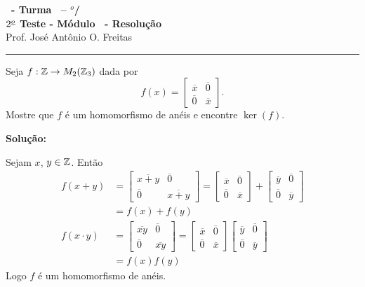\documentclass[12pt]{exam}
\begin{document}
\begin{center}
{\Large\bf \disciplina\ - Turma \turma\ -- \semestre$^{o}$/\ano} \\ \vspace{9pt} {\large\bf
$2^{\underline{o}}$ Teste - M\'odulo \modulo\ - Resolu\c{c}\~ao}\\
\vspace{9pt} Prof. Jos{\'e} Ant{\^o}nio O. Freitas
\end{center}
\hrule

\vspace{.6cm}

\questao{} Seja $f : \mathbb{Z} \to M_2(\mathbb{Z}_3)$ dada por
\[
	f(x) = \begin{bmatrix}
		\overline{x} & \overline{0}\\
		\overline{0} & \overline{x}
	\end{bmatrix}.
\]
Mostre que $f$ \'e um homomorfismo de an\'eis e encontre $\ker(f)$.

\noindent\textbf{Solu\c{c}\~ao:}

Sejam $x$, $y \in \mathbb{Z}$. Ent\~ao
\begin{align*}
	f(x + y) &= \begin{bmatrix}
		\overline{x + y} & \overline{0}\\
		\overline{0} & \overline{x + y}
	\end{bmatrix} = \begin{bmatrix}
		\overline{x} & \overline{0}\\
		\overline{0} & \overline{x}
	\end{bmatrix} + \begin{bmatrix}
		\overline{y} & \overline{0}\\
		\overline{0} & \overline{y}
	\end{bmatrix}\\ &= f(x) + f(y)\\
	f(x\cdot y) &= \begin{bmatrix}
		\overline{xy} & \overline{0}\\
		\overline{0} & \overline{xy}
	\end{bmatrix} = \begin{bmatrix}
		\overline{x} & \overline{0}\\
		\overline{0} & \overline{x}
	\end{bmatrix} \begin{bmatrix}
		\overline{y} & \overline{0}\\
		\overline{0} & \overline{y}
	\end{bmatrix}\\ &= f(x)f(y)
\end{align*}
Logo $f$ \'e um homomorfismo de an\'eis.
\end{document}
